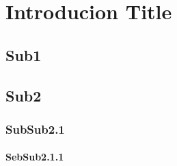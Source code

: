 

\chapter{Introducion Title}

\label{Label for title 2}

\section{Sub1}
\section{Sub2}
\subsection{SubSub2.1}
\subsubsection{SebSub2.1.1}